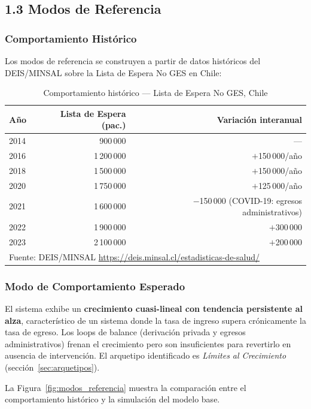 \documentclass[12pt,a4paper]{article}
\begin{document}
\subsection{1.3 Modos de Referencia}

\subsubsection*{Comportamiento Histórico}

Los modos de referencia se construyen a partir de datos históricos del DEIS/MINSAL sobre la Lista de Espera No GES en Chile:

\begin{table}[H]
\centering
\caption{Comportamiento histórico — Lista de Espera No GES, Chile}
\label{tab:historico}
\begin{tabular}{@{}lrr@{}}
\toprule
\rowcolor{azulDS!15}
\textbf{Año} & \textbf{Lista de Espera (pac.)} & \textbf{Variación interanual} \\
\midrule
2014 & 900\,000  & --- \\
2016 & 1\,200\,000 & $+$150\,000/año \\
2018 & 1\,500\,000 & $+$150\,000/año \\
2020 & 1\,750\,000 & $+$125\,000/año \\
2021 & 1\,600\,000 & $-$150\,000 (COVID-19: egresos administrativos) \\
2022 & 1\,900\,000 & $+$300\,000 \\
2023 & 2\,100\,000 & $+$200\,000 \\
\bottomrule
\multicolumn{3}{l}{\footnotesize Fuente: DEIS/MINSAL \url{https://deis.minsal.cl/estadisticas-de-salud/}}
\end{tabular}
\end{table}

\subsubsection*{Modo de Comportamiento Esperado}

El sistema exhibe un \textbf{crecimiento cuasi-lineal con tendencia persistente al alza}, característico de un sistema donde la tasa de ingreso supera crónicamente la tasa de egreso. Los loops de balance (derivación privada y egresos administrativos) frenan el crecimiento pero son insuficientes para revertirlo en ausencia de intervención. El arquetipo identificado es \textit{Límites al Crecimiento} (sección~\ref{sec:arquetipos}).

La Figura~\ref{fig:modos_referencia} muestra la comparación entre el comportamiento histórico y la simulación del modelo base.
\end{document}
